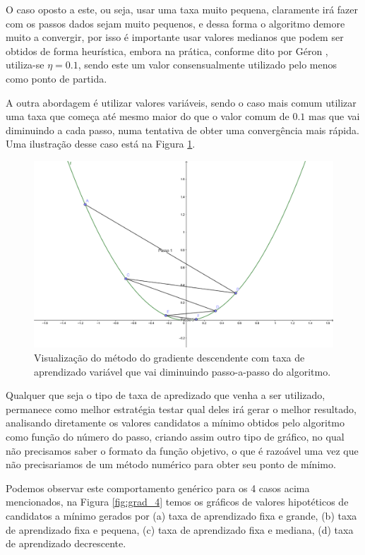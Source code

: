 O caso oposto a este, ou seja, usar uma taxa muito pequena, claramente irá fazer com os passos dados sejam muito pequenos, e dessa forma o algoritmo demore muito a convergir, por isso é importante usar valores medianos que podem ser obtidos de forma heurística, embora na prática, conforme dito por Géron \citep{hands}, utiliza-se $\eta = 0.1$, sendo este um valor consensualmente utilizado pelo menos como ponto de partida.

A outra abordagem é utilizar valores variáveis, sendo o caso mais comum utilizar uma taxa que começa até mesmo maior do que o valor comum de $0.1$ mas que vai diminuindo a cada passo, numa tentativa de obter uma convergência mais rápida. Uma ilustração desse caso está na Figura \ref{fig:grad_3}.

\begin{figure}[htb]
\centering
\includegraphics[height=7cm]{figuras/grad_3}
\caption{Visualização do método do gradiente descendente com taxa de aprendizado variável que vai diminuindo passo-a-passo do algoritmo.}
\label{fig:grad_3}
\end{figure}

Qualquer que seja o tipo de taxa de apredizado que venha a ser utilizado, permanece como melhor estratégia testar qual deles irá gerar o melhor resultado, analisando diretamente os valores candidatos a mínimo obtidos pelo algoritmo como função do número do passo, criando assim outro tipo de gráfico, no qual não precisamos saber o formato da função objetivo, o que é razoável uma vez que não precisariamos de um método numérico para obter seu ponto de mínimo.

Podemos observar este comportamento genérico para os 4 casos acima mencionados, na Figura \ref{fig:grad_4} temos os gráficos de valores hipotéticos de candidatos a mínimo gerados por (a) taxa de aprendizado fixa e grande, (b) taxa de aprendizado fixa e pequena, (c) taxa de aprendizado fixa e mediana, (d) taxa de aprendizado decrescente.

